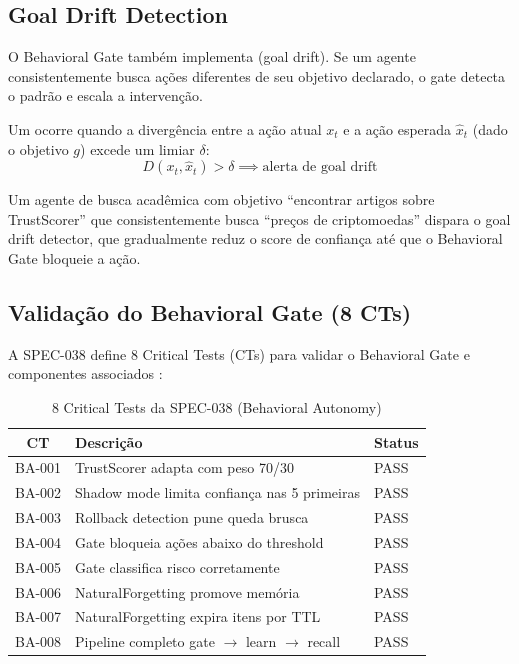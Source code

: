 \subsection{Goal Drift Detection}

O Behavioral Gate também implementa  (goal drift). Se um agente consistentemente busca ações
diferentes de seu objetivo declarado, o gate detecta o padrão e
escala a intervenção.

\begin{definicao}
Um  ocorre quando a divergência entre a
ação atual $x_t$ e a ação esperada $\hat{x}_t$ (dado o objetivo $g$)
excede um limiar $\delta$:
\[
D(x_t, \hat{x}_t) > \delta \implies \text{alerta de goal drift}
\]
\end{definicao}

\begin{exemplo}
Um agente de busca acadêmica com objetivo ``encontrar artigos sobre
TrustScorer'' que consistentemente busca ``preços de criptomoedas''
dispara o goal drift detector, que gradualmente reduz o score de
confiança até que o Behavioral Gate bloqueie a ação.
\end{exemplo}

\subsection{Validação do Behavioral Gate (8 CTs)}

A SPEC-038 define 8 Critical Tests (CTs) para validar o Behavioral
Gate e componentes associados \cite{opencode2026spec038}:

\begin{table}[htb]
\centering
\caption{8 Critical Tests da SPEC-038 (Behavioral Autonomy)}
\label{tab:cts-behavioral}
\begin{tabular}{cll}
\toprule
\textbf{CT} & \textbf{Descrição} & \textbf{Status} \\
\midrule
BA-001 & TrustScorer adapta com peso 70/30 & PASS \\
BA-002 & Shadow mode limita confiança nas 5 primeiras & PASS \\
BA-003 & Rollback detection pune queda brusca & PASS \\
BA-004 & Gate bloqueia ações abaixo do threshold & PASS \\
BA-005 & Gate classifica risco corretamente & PASS \\
BA-006 & NaturalForgetting promove memória & PASS \\
BA-007 & NaturalForgetting expira itens por TTL & PASS \\
BA-008 & Pipeline completo gate $\to$ learn $\to$ recall & PASS \\
\bottomrule
\end{tabular}
\end{table}

